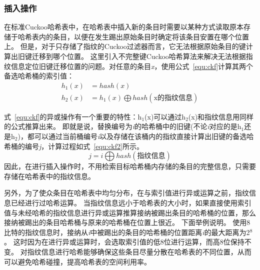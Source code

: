 \subsubsection{插入操作}
在标准Cuckoo哈希表中，在哈希表中插入新的条目时需要以某种方式读取原本存储于哈希表内的条目，以便在发生踢出原始条目时确定将该条目安置在哪个位置上。
但是，对于只存储了指纹的Cuckoo过滤器而言，它无法根据原始条目的键计算出旧键迁移到哪个位置。
这里引入不完整键Cuckoo哈希算法来解决无法根据指纹信息定位旧键迁移位置的问题。对任意的条目\textit{x}，使用公式~\ref{equ:ckf}计算其两个备选哈希桶的索引值：
\begin{equation}
\begin{split}
h_1\left(x\right) &= hash\left(x\right) \\
h_2(x) &= h_1(x)\bigoplus hash(\text{x的指纹信息})
\end{split}
\label{equ:ckf}
\end{equation}

式~\ref{equ:ckf}的异或操作有一个重要的特性：h$_1$(x)可以通过h$_2$(x)和指纹信息用同样的公式推算出来。
即就是说，替换编号为\textit{i}的哈希桶中的旧键(不论\textit{i}对应的是h$_1$还是h$_2$)，都可以通过当前桶编号\textit{i}以及存储在该桶内的指纹直接计算出旧键的备选哈希桶的编号\textit{j}，计算过程如式~\ref{equ:ckf2}所示。
\begin{equation}
j = i \bigoplus hash(\text{指纹信息})
%
\end{equation}
因此，在进行插入操作时，不用检索目标哈希桶内存储的条目的完整信息，只需要存储在哈希表中的指纹信息。

另外，为了使众条目在哈希表中均匀分布，在与索引值进行异或运算之前，指纹信息已经进行过哈希运算。
当指纹信息远小于哈希表的大小时，如果直接使用索引值与未经哈希的指纹信息进行异或运算推算接纳被踢出条目的哈希桶的位置，那么接纳被踢出的条目哈希桶与原来的哈希桶在位置上很近。
下面举例说明。
使用8比特的指纹信息时，接纳从\textit{i}中被踢出的条目的哈希桶的位置距离\textit{i}的最大距离为2$^8$。
这时因为在进行异或运算时，会选取索引值的低8位进行运算，而高8位保持不变。
对指纹信息进行哈希能够确保这些条目尽量分散在哈希表的不同位置，从而可以避免哈希碰撞，提高哈希表的空间利用率。

